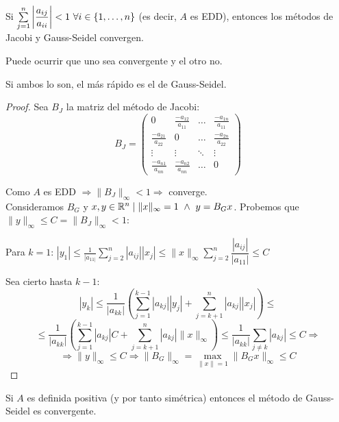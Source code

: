 \begin{teo}
    Si $\sum\limits_{j=1}^n\left|\dfrac{a_{ij}}{a_{ii}}\right| <1 \ \forall i \in \{1, \ldots, n\}$ (es decir, $A$ es EDD), entonces los métodos
    de Jacobi y Gauss-Seidel convergen.

    Puede ocurrir que uno sea convergente y el otro no.

    Si ambos lo son, el más rápido es el de Gauss-Seidel.
\end{teo}
\begin{proof}
    Sea $B_J$ la matriz del método de Jacobi:
    $$
        B_J = \left(\begin{array}{cccc}
                0                      & \frac{-a_{12}}{a_{11}} & \ldots & \frac{-a_{1n}}{a_{11}} \\
                \frac{-a_{21}}{a_{22}} & 0                      & \ldots & \frac{-a_{2n}}{a_{22}} \\
                \vdots                 & \vdots                 & \ddots & \vdots                 \\
                \frac{-a_{n1}}{a_{nn}} & \frac{-a_{n2}}{a_{nn}} & \ldots & 0
            \end{array}\right)
    $$

    Como $A$ es EDD $\Rightarrow \|B_J\|_\infty <1 \Rightarrow$ converge.\\

    Consideramos $B_G$ y $x,y\in\R^n \mid \|x\|_\infty=1 \ \land \ y=B_Gx$. Probemos que $\|y\|_\infty\leq C=\|B_J\|_\infty<1$:

    Para $k=1$: $|y_1|\leq \frac{1}{|a_{11|}}\sum\limits_{j=2}^n |a_{ij}||x_j| \leq \|x\|_\infty \sum\limits_{j=2}^n \dfrac{|a_{ij}|}{|a_{11}|}\leq C$

    Sea cierto hasta $k-1$: $$|y_k|\leq \dfrac{1}{|a_{kk}|}\left( \sum_{j=1}^{k-1}|a_{kj}||y_j| + \sum\limits_{j=k+1}^n |a_{kj}||x_j| \right)
        \leq$$ $$\leq \frac{1}{|a_{kk}|}\left(\sum_{j=1}^{k-1}|a_{kj}|C + \sum_{j=k+1}^n |a_{kj}|\|x\|_\infty \right) \leq
        \dfrac{1}{|a_{kk}|}\sum_{j\neq k}|a_{kj}|\leq C \Rightarrow$$ $$ \Rightarrow \|y\|_\infty \leq C \Rightarrow \|B_G\|_\infty =
        \max\limits_{\|x\|=1}\|B_Gx\|_\infty \leq C$$
\end{proof}

\begin{teo}
    Si $A$ es definida positiva (y por tanto simétrica) entonces el método de Gauss-Seidel es convergente.
\end{teo}

